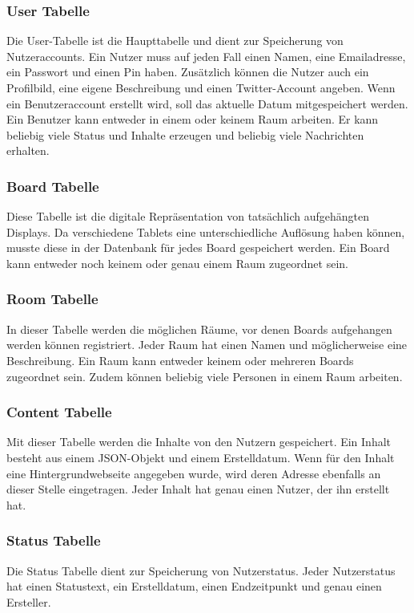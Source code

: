 \subsubsection{User Tabelle}\label{User Tabelle}
Die User-Tabelle ist die Haupttabelle und dient zur Speicherung von Nutzeraccounts. Ein Nutzer muss auf jeden Fall einen Namen, eine Emailadresse, ein Passwort und einen Pin haben.
Zusätzlich können die Nutzer auch ein Profilbild, eine eigene Beschreibung und einen Twitter-Account angeben.
Wenn ein Benutzeraccount erstellt wird, soll das aktuelle Datum mitgespeichert werden.
\\
Ein Benutzer kann entweder in einem oder keinem Raum arbeiten. Er kann beliebig viele Status und Inhalte erzeugen und beliebig viele Nachrichten erhalten.
\subsubsection{Board Tabelle}\label{Board Tabelle}
Diese Tabelle ist die digitale Repräsentation von tatsächlich aufgehängten Displays. Da verschiedene Tablets eine unterschiedliche Auflösung haben können, musste diese in der Datenbank für jedes Board gespeichert werden. Ein Board kann entweder noch keinem oder genau einem Raum zugeordnet sein.
\subsubsection{Room Tabelle}\label{Room Tabelle}
In dieser Tabelle werden die möglichen Räume, vor denen Boards aufgehangen werden können registriert. Jeder Raum hat einen Namen und möglicherweise eine Beschreibung. Ein Raum kann entweder keinem oder mehreren Boards zugeordnet sein. Zudem können beliebig viele Personen in einem Raum arbeiten.
\subsubsection{Content Tabelle}\label{Content Tabelle}
Mit dieser Tabelle werden die Inhalte von den Nutzern gespeichert. Ein Inhalt besteht aus einem JSON-Objekt und einem Erstelldatum. Wenn für den Inhalt eine Hintergrundwebseite angegeben wurde, wird deren Adresse ebenfalls an dieser Stelle eingetragen. Jeder Inhalt hat genau einen Nutzer, der ihn erstellt hat.
\subsubsection{Status Tabelle}\label{Status Tabelle}
Die Status Tabelle dient zur Speicherung von Nutzerstatus. Jeder Nutzerstatus hat einen Statustext, ein Erstelldatum, einen Endzeitpunkt und genau einen Ersteller. 
